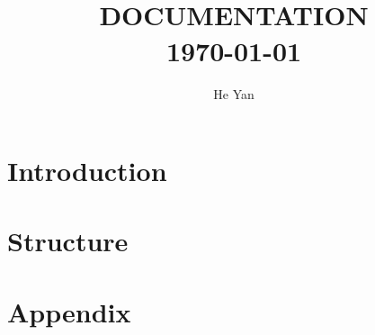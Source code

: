 


\title{
        \HRule{2pt}\\
        \LARGE \textbf{\uppercase{Documentation}}
        \HRule{2pt} \\ [0.5cm]
        \normalsize \today \vspace*{5\baselineskip}}

\date{}

\author{He Yan}

\maketitle
\tableofcontents
\setcounter{page}{0}
\thispagestyle{empty}
\newpage

\section*{Introduction}

\section{Structure}



\newpage
\section*{Appendix}


